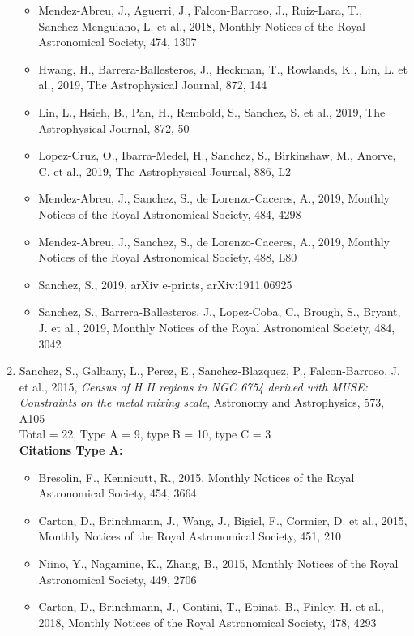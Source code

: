 \documentclass{letter}
\begin{document}
\begin{enumerate}
\begin{itemize}
\item Mendez-Abreu, J., Aguerri, J., Falcon-Barroso, J., Ruiz-Lara, T., Sanchez-Menguiano, L. et al., 2018, Monthly Notices of the Royal Astronomical Society, 474, 1307
\item Hwang, H., Barrera-Ballesteros, J., Heckman, T., Rowlands, K., Lin, L. et al., 2019, The Astrophysical Journal, 872, 144
\item Lin, L., Hsieh, B., Pan, H., Rembold, S., Sanchez, S. et al., 2019, The Astrophysical Journal, 872, 50
\item Lopez-Cruz, O., Ibarra-Medel, H., Sanchez, S., Birkinshaw, M., Anorve, C. et al., 2019, The Astrophysical Journal, 886, L2
\item Mendez-Abreu, J., Sanchez, S., de Lorenzo-Caceres, A., 2019, Monthly Notices of the Royal Astronomical Society, 484, 4298
\item Mendez-Abreu, J., Sanchez, S., de Lorenzo-Caceres, A., 2019, Monthly Notices of the Royal Astronomical Society, 488, L80
\item Sanchez, S., 2019, arXiv e-prints, arXiv:1911.06925
\item Sanchez, S., Barrera-Ballesteros, J., Lopez-Coba, C., Brough, S., Bryant, J. et al., 2019, Monthly Notices of the Royal Astronomical Society, 484, 3042
\end{itemize}
\item Sanchez, S., Galbany, L., Perez, E., Sanchez-Blazquez, P., Falcon-Barroso, J. et al., 2015, {\it Census of H II regions in NGC 6754 derived with MUSE: Constraints on the metal mixing scale}, Astronomy and Astrophysics, 573, A105 \\ 
Total = 22, Type A = 9, type B = 10, type C = 3 \\ 
{\bf Citations Type A:}
\begin{itemize}
\item Bresolin, F., Kennicutt, R., 2015, Monthly Notices of the Royal Astronomical Society, 454, 3664
\item Carton, D., Brinchmann, J., Wang, J., Bigiel, F., Cormier, D. et al., 2015, Monthly Notices of the Royal Astronomical Society, 451, 210
\item Niino, Y., Nagamine, K., Zhang, B., 2015, Monthly Notices of the Royal Astronomical Society, 449, 2706
\item Carton, D., Brinchmann, J., Contini, T., Epinat, B., Finley, H. et al., 2018, Monthly Notices of the Royal Astronomical Society, 478, 4293

\end{itemize}
\end{enumerate}
\end{document}

